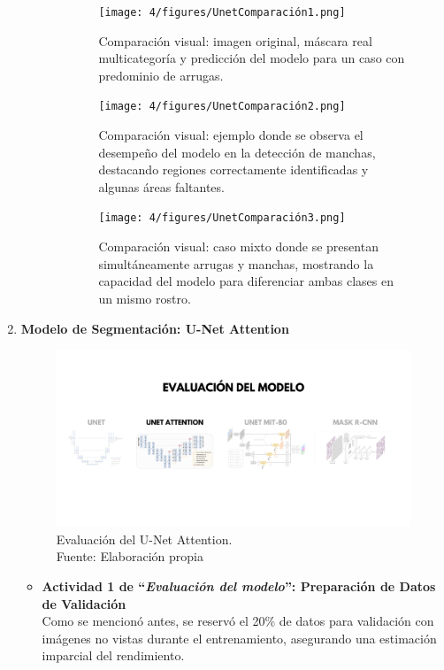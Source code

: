 \begin{enumerate}
\begin{itemize}
\begin{itemize}
  \vspace{0.2cm}
  \begin{figure}[H]
\centering
\texttt{[image: 4/figures/UnetComparación1.png]}
\caption{Comparación visual: imagen original, máscara real multicategoría y predicción del modelo para un caso con predominio de arrugas.}
\label{fig:validacion11}
\end{figure}

\begin{figure}[H]
\centering
\texttt{[image: 4/figures/UnetComparación2.png]}
\caption{Comparación visual: ejemplo donde se observa el desempeño del modelo en la detección de manchas, destacando regiones correctamente identificadas y algunas áreas faltantes.}
\label{fig:validacion22}
\end{figure}

\begin{figure}[H]
\centering
\texttt{[image: 4/figures/UnetComparación3.png]}
\caption{Comparación visual: caso mixto donde se presentan simultáneamente arrugas y manchas, mostrando la capacidad del modelo para diferenciar ambas clases en un mismo rostro.}
\label{fig:validacion33}
\end{figure}
\end{itemize}

  \end{itemize}
  \newpage
  \item \textbf{Modelo de Segmentación: U-Net Attention}
  \begin{figure}[H]
	\begin{center}
		\includegraphics[width=1\textwidth]{4/figures/evunetat.png}
		\caption[Evaluación del U-Net Attention]{Evaluación del U-Net Attention.\\
		Fuente: Elaboración propia}
		\label{4:figevunetat}
	\end{center}
\end{figure}
  \begin{itemize}
  \item\textbf{Actividad 1 de “\textit{Evaluación del modelo}”: Preparación de Datos de Validación}
  \\
  Como se mencionó antes, se reservó el 20\% de datos para validación con imágenes no vistas durante el entrenamiento, asegurando una estimación imparcial del rendimiento.
  


\end{itemize}
\end{enumerate}
